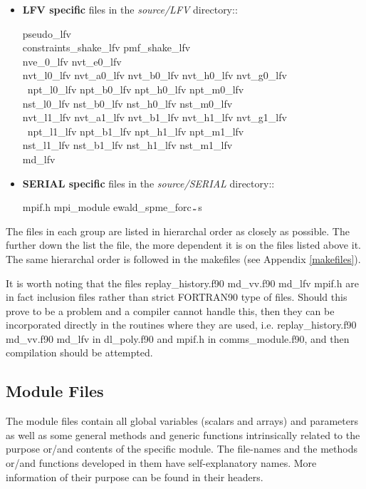 \begin{itemize}
\item {\bf LFV specific} files in the {\em source/LFV} directory::

{\sc
pseudo\_lfv \\
constraints\_shake\_lfv pmf\_shake\_lfv \\
nve\_0\_lfv nvt\_e0\_lfv \\
nvt\_l0\_lfv nvt\_a0\_lfv nvt\_b0\_lfv nvt\_h0\_lfv nvt\_g0\_lfv \\\
npt\_l0\_lfv npt\_b0\_lfv npt\_h0\_lfv npt\_m0\_lfv \\
nst\_l0\_lfv nst\_b0\_lfv nst\_h0\_lfv nst\_m0\_lfv \\
nvt\_l1\_lfv nvt\_a1\_lfv nvt\_b1\_lfv nvt\_h1\_lfv nvt\_g1\_lfv \\\
npt\_l1\_lfv npt\_b1\_lfv npt\_h1\_lfv npt\_m1\_lfv \\
nst\_l1\_lfv nst\_b1\_lfv nst\_h1\_lfv nst\_m1\_lfv \\
md\_lfv}

\item {\bf SERIAL specific} files in the {\em source/SERIAL} directory::

{\sc mpif.h mpi\_module ewald\_spme\_forc$_{\verb"~"}$s}

\end{itemize}
The files in each group are listed in hierarchal order as closely
as possible.  The further down the list the file, the more dependent
it is on the files listed above it.  The same hierarchal order is
followed in the makefiles (see Appendix \ref{makefiles}).

It is worth noting that the files {\sc replay\_history.f90 md\_vv.f90 md\_lfv mpif.h}
are in fact inclusion files rather than strict FORTRAN90 
type of files.  Should this prove to be a problem and a compiler cannot handle
this, then they can be incorporated directly in the routines
where they are used, i.e. {\sc replay\_history.f90 md\_vv.f90 md\_lfv}
in {\sc dl\_poly.f90} and {\sc  mpif.h} in {\sc comms\_module.f90},
and then compilation should be attempted.

\subsection{Module Files}

The \D module files contain all global variables (scalars and
arrays) and parameters as well as some general methods and generic
functions intrinsically related to the purpose or/and contents of
the specific module.  The file-names and the methods or/and
functions developed in them have self-explanatory names.  More
information of their purpose can be found in their headers.

